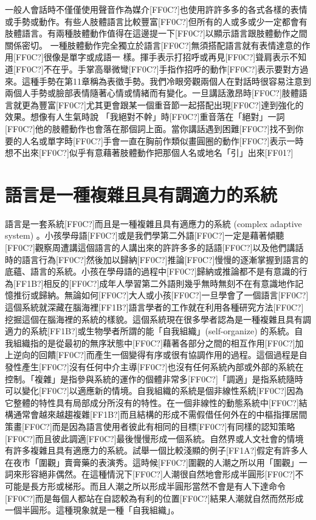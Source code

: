 一般人會話時不僅僅使用聲音作為媒介[FF0C?]也使用許許多多的各式各樣的表情或手勢或動作。有些人肢體語言比較豐富[FF0C?]但所有的人或多或少一定都會有肢體語言。有兩種肢體動作值得在這邊提一下[FF0C?]以顯示語言跟肢體動作之間關係密切。 一種肢體動作完全獨立於語言[FF0C?]無須搭配語言就有表情達意的作用[FF0C?]很像是單字或成語一 樣。揮手表示打招呼或再見[FF0C?]聳肩表示不知道[FF0C?]不在乎。手掌高舉微彎[FF0C?]手指作招呼的動作[FF0C?]表示要對方過來。這種手勢在第11章稱為表徵手勢。我們冷眼旁觀兩個人在對話時很容易注意到兩個人手勢或臉部表情隨著心情或情緒而有變化。一旦講話激昂時[FF0C?]肢體語言就更為豐富[FF0C?]尤其更會跟某一個重音節一起搭配出現[FF0C?]達到強化的效果。想像有人生氣時說 「我絕對不幹」時[FF0C?]重音落在「絕對」一詞[FF0C?]他的肢體動作也會落在那個詞上面。當你講話遇到困難[FF0C?]找不到你要的人名或單字時[FF0C?]手會一直在胸前作類似畫圓圈的動作[FF0C?]表示一時想不出來[FF0C?]似乎有意藉著肢體動作把那個人名或地名「引」出來[FF01?]

\section{語言是一種複雜且具有調適力的系統}

語言是一套系統[FF0C?]而且是一種複雜且具有適應力的系統 (complex adaptive system) \citep{BecknerEtAl2009}。小孩學母語[FF0C?]或是我們學第二外語[FF0C?]一定是藉著傾聽[FF0C?]觀察周遭講這個語言的人講出來的許許多多的話語[FF0C?]以及他們講話時的語言行為[FF0C?]然後加以歸納[FF0C?]推論[FF0C?]慢慢的逐漸掌握到語言的底蘊、語言的系統。小孩在學母語的過程中[FF0C?]歸納或推論都不是有意識的行為[FF1B?]相反的[FF0C?]成年人學習第二外語則幾乎無時無刻不在有意識地作記憶推衍或歸納。無論如何[FF0C?]大人或小孩[FF0C?]一旦學會了一個語言[FF0C?]這個系統就深藏在腦海裡[FF1B?]語言學者的工作就在利用各種研究方法[FF0C?]挖掘這個在腦海裡的系統的樣貌。這個系統現在很多學者認為是一種複雜且具有調適力的系統[FF1B?]或生物學者所謂的能「自我組織」(self-organize) 的系統。自我組織指的是從最初的無序狀態中[FF0C?]藉著各部分之間的相互作用[FF0C?]加上逆向的回饋[FF0C?]而產生一個變得有序或很有協調作用的過程。這個過程是自發性產生[FF0C?]沒有任何中介主導[FF0C?]也沒有任何系統內部或外部的系統在控制。「複雜」是指參與系統的運作的個體非常多[FF0C?]「調適」是指系統隨時可以變化[FF0C?]以適應新的情境。自我組織的系統是個非線性系統[FF0C?]因為它整體的特性具有局部成分所沒有的特性。在一個非線性的動態系統中[FF0C?]結構通常會越來越趨複雜[FF1B?]而且結構的形成不需假借任何外在的中樞指揮居間策畫[FF0C?]而是因為語言使用者彼此有相同的目標[FF0C?]有同樣的認知策略[FF0C?]而且彼此調適[FF0C?]最後慢慢形成一個系統。自然界或人文社會的情境有許多複雜且具有適應力的系統。試舉一個比較淺顯的例子[FF1A?]假定有許多人在夜市「圍觀」賣膏藥的表演秀。這時候[FF0C?]圍觀的人潮之所以用「圍觀」一詞來形容絕非偶然。在這種情況下[FF0C?]人潮很自然地會形成半圓形[FF0C?]不可能是長方形或梯形。而且人潮之所以形成半圓形當然不會是有人下達命令[FF0C?]而是每個人都站在自認較為有利的位置[FF0C?]結果人潮就自然而然形成一個半圓形。這種現象就是一種「自我組織」。

